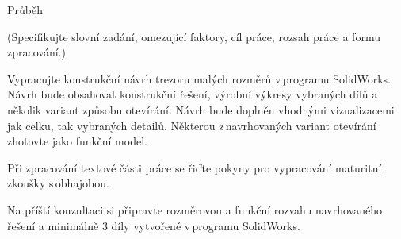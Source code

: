 
Průběh 

(Specifikujte slovní zadání, omezující faktory, cíl práce, rozsah práce a formu zpracování.) 

Vypracujte konstrukční návrh trezoru malých rozměrů v programu SolidWorks. Návrh bude obsahovat 
konstrukční řešení, výrobní výkresy vybraných dílů a několik variant způsobu otevírání. 
Návrh bude doplněn vhodnými vizualizacemi jak celku, tak vybraných detailů. Některou z navrhovaných 
variant otevírání zhotovte jako funkční model. 

Při zpracování textové části práce se řiďte pokyny pro vypracování maturitní zkoušky s obhajobou. 

Na příští konzultaci si připravte rozměrovou a funkční rozvahu navrhovaného řešení a minimálně 3 díly 
vytvořené v programu SolidWorks. 
